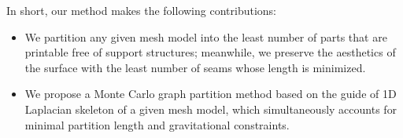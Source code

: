 In short, our method makes the following contributions:

\begin{itemize}
\item {We partition any given mesh model into the least number of parts that are printable free of support structures; meanwhile, we preserve the aesthetics of the surface with the least number of seams whose length is minimized.}
\item {We propose a Monte Carlo graph partition method based on the guide of 1D Laplacian skeleton of a given mesh model, which simultaneously accounts for minimal partition length and gravitational constraints.}
\end{itemize}
